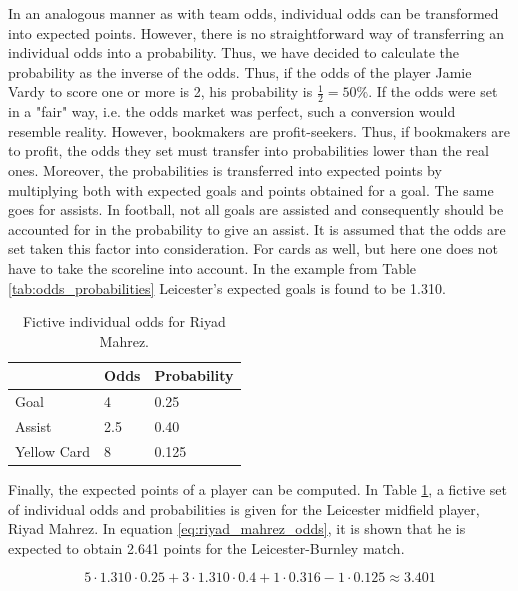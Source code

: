 In an analogous manner as with team odds, individual odds can be transformed into expected points. However, there is no straightforward way of transferring an individual odds into a probability. Thus, we have decided to calculate the probability as the inverse of the odds. Thus, if the odds of the player Jamie Vardy to score one or more is 2, his probability is $\frac{1}{2}=50\%$. If the odds were set in a "fair" way, i.e. the odds market was perfect, such a conversion would resemble reality. However, bookmakers are profit-seekers. Thus, if bookmakers are to profit, the odds they set must transfer into probabilities lower than the real ones. Moreover, the probabilities is transferred into expected points by multiplying both with expected goals and points obtained for a goal. The same goes for assists. In football, not all goals are assisted and consequently should be accounted for in the probability to give an assist. It is assumed that the odds are set taken this factor into consideration. For cards as well, but here one does not have to take the scoreline into account. In the example from Table \ref{tab:odds_probabilities} Leicester's expected goals is found to be 1.310. 


\begin{table}[H]
\centering
\begin{tabular}{@{}lll@{}}
\toprule
            & Odds & Probability \\ 
            \midrule
Goal        & 4    & 0.25        \\
Assist      & 2.5  & 0.40         \\
Yellow Card & 8    & 0.125       \\ 
\bottomrule
\end{tabular}
\caption{Fictive individual odds for Riyad Mahrez.}
\label{tab:ind_odds_riyad_mahrez}
\end{table}


Finally, the expected points of a player can be computed. In Table \ref{tab:ind_odds_riyad_mahrez}, a fictive set of individual odds and probabilities is given for the Leicester midfield player, Riyad Mahrez. In equation \ref{eq:riyad_mahrez_odds}, it is shown that he is expected to obtain 2.641 points for the Leicester-Burnley match.


\begin{equation} \label{eq:riyad_mahrez_odds}
    5 \cdot 1.310 \cdot 0.25 + 3 \cdot 1.310 \cdot 0.4 + 1 \cdot 0.316 - 1 \cdot 0.125 \approx 3.401
\end{equation}


